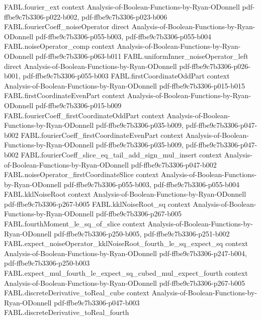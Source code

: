\begin{theorem}
\proofstep
  {FABL.fourier_ext}
  {context}
  {Analysis-of-Boolean-Functions-by-Ryan-ODonnell}
  {pdf-ffbe9c7b3306-p022-b002,
    pdf-ffbe9c7b3306-p023-b006}
\proofstep
  {FABL.fourierCoeff_noiseOperator}
  {direct}
  {Analysis-of-Boolean-Functions-by-Ryan-ODonnell}
  {pdf-ffbe9c7b3306-p055-b003,
    pdf-ffbe9c7b3306-p055-b004}
\proofstep
  {FABL.noiseOperator_comp}
  {context}
  {Analysis-of-Boolean-Functions-by-Ryan-ODonnell}
  {pdf-ffbe9c7b3306-p063-b011}
\proofstep
  {FABL.uniformInner_noiseOperator_left}
  {direct}
  {Analysis-of-Boolean-Functions-by-Ryan-ODonnell}
  {pdf-ffbe9c7b3306-p026-b001,
    pdf-ffbe9c7b3306-p055-b003}
\proofstep
  {FABL.firstCoordinateOddPart}
  {context}
  {Analysis-of-Boolean-Functions-by-Ryan-ODonnell}
  {pdf-ffbe9c7b3306-p015-b015}
\proofstep
  {FABL.firstCoordinateEvenPart}
  {context}
  {Analysis-of-Boolean-Functions-by-Ryan-ODonnell}
  {pdf-ffbe9c7b3306-p015-b009}
\proofstep
  {FABL.fourierCoeff_firstCoordinateOddPart}
  {context}
  {Analysis-of-Boolean-Functions-by-Ryan-ODonnell}
  {pdf-ffbe9c7b3306-p035-b009,
    pdf-ffbe9c7b3306-p047-b002}
\proofstep
  {FABL.fourierCoeff_firstCoordinateEvenPart}
  {context}
  {Analysis-of-Boolean-Functions-by-Ryan-ODonnell}
  {pdf-ffbe9c7b3306-p035-b009,
    pdf-ffbe9c7b3306-p047-b002}
\proofstep
  {FABL.fourierCoeff_slice_eq_tail_add_sign_mul_insert}
  {context}
  {Analysis-of-Boolean-Functions-by-Ryan-ODonnell}
  {pdf-ffbe9c7b3306-p047-b002}
\proofstep
  {FABL.noiseOperator_firstCoordinateSlice}
  {context}
  {Analysis-of-Boolean-Functions-by-Ryan-ODonnell}
  {pdf-ffbe9c7b3306-p055-b003,
    pdf-ffbe9c7b3306-p055-b004}
\proofstep
  {FABL.kklNoiseRoot}
  {context}
  {Analysis-of-Boolean-Functions-by-Ryan-ODonnell}
  {pdf-ffbe9c7b3306-p267-b005}
\proofstep
  {FABL.kklNoiseRoot_sq}
  {context}
  {Analysis-of-Boolean-Functions-by-Ryan-ODonnell}
  {pdf-ffbe9c7b3306-p267-b005}
\proofstep
  {FABL.fourthMoment_le_sq_of_slice}
  {context}
  {Analysis-of-Boolean-Functions-by-Ryan-ODonnell}
  {pdf-ffbe9c7b3306-p250-b005,
    pdf-ffbe9c7b3306-p251-b002}
\proofstep
  {FABL.expect_noiseOperator_kklNoiseRoot_fourth_le_sq_expect_sq}
  {context}
  {Analysis-of-Boolean-Functions-by-Ryan-ODonnell}
  {pdf-ffbe9c7b3306-p247-b004,
    pdf-ffbe9c7b3306-p250-b003}
\proofstep
  {FABL.expect_mul_fourth_le_expect_sq_cubed_mul_expect_fourth}
  {context}
  {Analysis-of-Boolean-Functions-by-Ryan-ODonnell}
  {pdf-ffbe9c7b3306-p267-b005}
\proofstep
  {FABL.discreteDerivative_toReal_cube}
  {context}
  {Analysis-of-Boolean-Functions-by-Ryan-ODonnell}
  {pdf-ffbe9c7b3306-p047-b003}
\proofstep
  {FABL.discreteDerivative_toReal_fourth}

\end{theorem}
